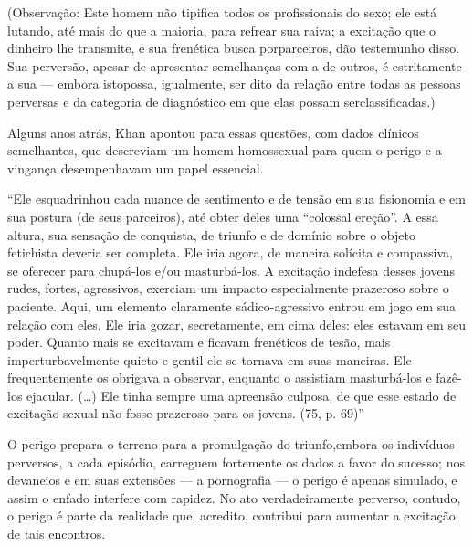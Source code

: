 (Observação: Este homem não tipifica todos os profissionais do sexo;
ele está lutando, até mais do que a maioria, para refrear sua raiva; a
excitação que o dinheiro lhe transmite, e sua frenética busca por\idxprost[|)]
parceiros, dão testemunho disso. Sua perversão, apesar de apresentar
semelhanças com a de outros, é estritamente a sua --- embora isto\idxprosthom[|)]
possa, igualmente, ser dito da relação entre todas as pessoas perversas
e da categoria de diagnóstico em que elas possam ser\idxhomospros[|)] classificadas.)

Alguns anos atrás, Khan\idxkhan{} apontou para essas questões, com dados
clínicos semelhantes, que descreviam um homem homossexual para quem o
perigo e a vingança\idxhomosperi{} desempenhavam um papel essencial.

``Ele esquadrinhou cada nuance de sentimento e de
tensão em sua fisionomia e em sua postura (de seus parceiros), até
obter deles uma ``colossal ereção''. A
essa altura, sua sensação de conquista, de triunfo e de domínio sobre o
objeto fetichista deveria ser completa. Ele iria agora, de maneira
solícita e compassiva, se oferecer para chupá-los e/ou masturbá-los. A
excitação indefesa desses jovens rudes, fortes, agressivos, exerciam um
impacto especialmente prazeroso sobre o paciente. Aqui, um elemento
claramente sádico-agressivo entrou em jogo em sua relação com eles. Ele
iria gozar, secretamente, em cima deles: eles estavam em seu poder.
Quanto mais se excitavam e ficavam frenéticos de tesão, mais
imperturbavelmente quieto e gentil ele se tornava em suas maneiras. Ele
frequentemente os obrigava a observar, enquanto o assistiam
masturbá-los e fazê-los ejacular. (\ldots{}) Ele tinha sempre uma apreensão
culposa, de que esse estado de excitação sexual não fosse prazeroso
para os jovens. (75, p. 69)''

O perigo prepara o terreno para a promulgação do triunfo,\idxtraumapros[|)] embora os
indivíduos perversos, a cada episódio, carreguem fortemente os dados a
favor do sucesso; nos devaneios e em suas extensões --- a pornografia
--- o perigo é apenas simulado, e assim o enfado interfere com
rapidez. No ato verdadeiramente perverso, contudo, o perigo é parte da
realidade que, acredito, contribui para aumentar a excitação de tais
encontros.

